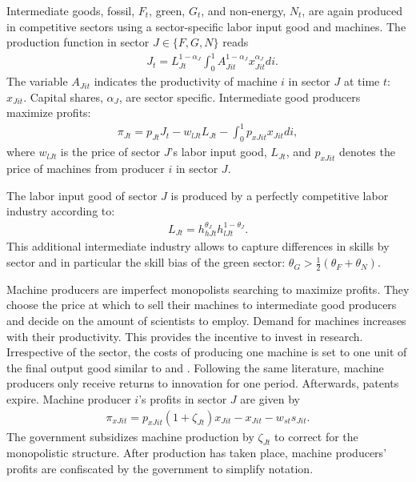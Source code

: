 Intermediate goods, fossil, $F_t$, green, $G_t$, and non-energy, $N_t$, are again produced in competitive sectors using a sector-specific labor input good and machines. The production function in sector $J\in \{F,G,N\}$ reads
\begin{align*}
&J_{t}= L_{Jt}^{1-\alpha_J}\int_{0}^{1}A_{Jit}^{1-\alpha_J}x_{Jit}^{\alpha_J} di.
\end{align*}
The variable $A_{Jit}$ indicates the productivity of machine $i$ in sector $J$ at time $t$: $x_{Jit}$. 
Capital shares, $\alpha_J$, are sector specific. 
Intermediate good producers maximize profits: 
\begin{align*}
\pi_{Jt}=p_{Jt}J_t-w_{lJt}L_{Jt}-\int_{0}^{1}p_{xJit}x_{Jit}di,
\end{align*}
where $w_{lJt}$ is the price of sector $J$'s labor input good, $L_{Jt}$, and $p_{xJit}$ denotes the price of machines from producer $i$ in sector $J$. 

The labor input good of sector $J$ is produced by a perfectly competitive labor industry according to:
\begin{align*}
L_{Jt}=h_{hJt}^{\theta_J}h_{lJt}^{1-\theta_J}.
\end{align*}
This additional intermediate industry allows to capture differences in skills by sector and in particular the skill bias of the green sector: $\theta_G>\frac{1}{2}(\theta_F+\theta_N)$. 

Machine producers are imperfect monopolists searching to maximize profits. They choose the price at which to sell their machines to intermediate good producers and decide on the amount of scientists to employ. Demand for machines increases with their productivity. This provides the incentive to invest in research. Irrespective of the sector, the costs of producing one machine is set to one unit of the final output good similar to \cite{Fried2018ClimateAnalysis} and \cite{Acemoglu2012TheChange}. 
Following the same literature, machine producers only receive returns to innovation for one period. Afterwards, patents expire. Machine producer $i$'s profits in sector $J$ are given by
\begin{align*}
\pi_{xJit}=p_{xJit}(1+\zeta_{Jt})x_{Jit}-x_{Jit}-w_{st}s_{Jit}.
\end{align*}
The government subsidizes machine production by $\zeta_{Jt}$ to correct for the monopolistic structure. After production has taken place, machine producers' profits are confiscated by the government to simplify notation.

